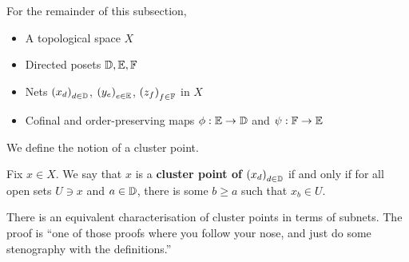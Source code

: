 For the remainder of this subsection,
\begin{itemize}
    \item A topological space $X$
    \item Directed posets $\mathbb{D}, \mathbb{E}, \mathbb{F}$
    \item Nets $\left( x_d \right)_{d \in \mathbb{D}}$, $\left( y_e \right)_{e \in \mathbb{E}}$, $\left( z_f \right)_{f \in \mathbb{F}}$ in $X$
    \item Cofinal and order-preserving maps $\phi : \mathbb{E} \to \mathbb{D}$ and $\psi : \mathbb{F} \to \mathbb{E}$
\end{itemize}

We define the notion of a cluster point.

\begin{boxdefinition}\label{Ch2:Def:ClusterPt}
    Fix $x \in X$. We say that $x$ is a \textbf{cluster point of $\left( x_d \right)_{d \in \mathbb{D}}$} if and only if for all open sets $U \ni x$ and $a \in \mathbb{D}$, there is some $b \geq a$ such that $x_b \in U$.
\end{boxdefinition}

There is an equivalent characterisation of cluster points in terms of subnets. The proof is ``one of those proofs where you follow your nose, and just do some stenography with the definitions.''  %

